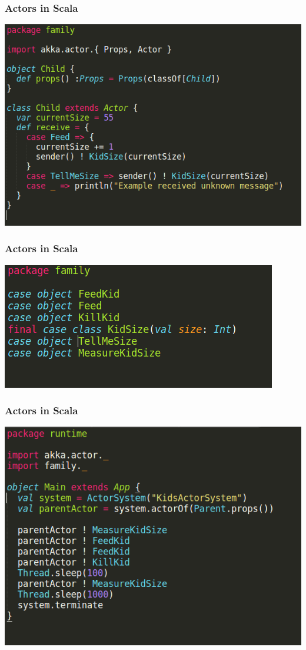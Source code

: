 \documentclass{beamer}
\begin{document}

\begin{frame}
\frametitle{Actors in Scala}
\includegraphics[width=0.9\linewidth]{./images/parent_child.png}
\end{frame}


\begin{frame}
\frametitle{Actors in Scala}
\includegraphics[width=1\linewidth]{./images/parent_messages.png}
\end{frame}


\begin{frame}
\frametitle{Actors in Scala}
\includegraphics[width=0.8\linewidth]{./images/parent_main.png}
\end{frame}
\end{document}
